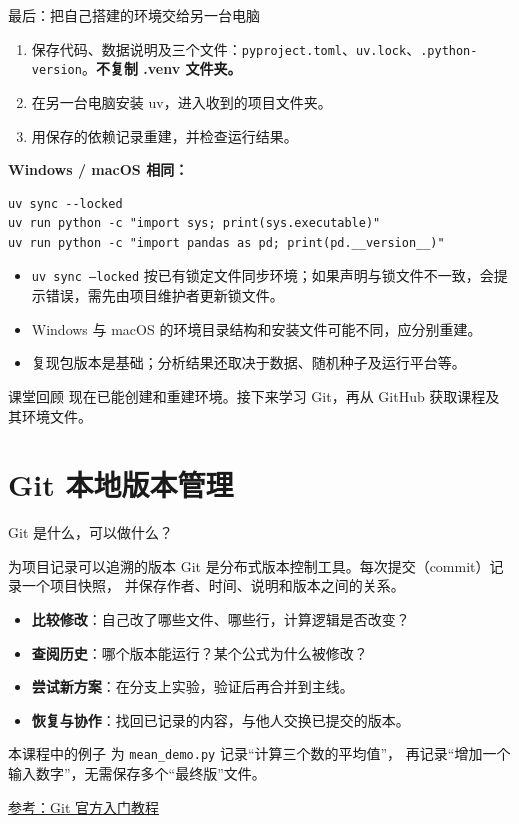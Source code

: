 \documentclass[9pt]{ctexbeamer}
\begin{document}
\begin{frame}[fragile]{最后：把自己搭建的环境交给另一台电脑}
  \begin{enumerate}
    \item 保存代码、数据说明及三个文件：\texttt{pyproject.toml}、\texttt{uv.lock}、\texttt{.python-version}。\textbf{不复制 .venv 文件夹。}
    \item 在另一台电脑安装 uv，进入收到的项目文件夹。
    \item 用保存的依赖记录重建，并检查运行结果。
  \end{enumerate}
  \textbf{Windows / macOS 相同：}
\begin{lstlisting}[language={},numbers=none]
uv sync --locked
uv run python -c "import sys; print(sys.executable)"
uv run python -c "import pandas as pd; print(pd.__version__)"
\end{lstlisting}
  \begin{itemize}
    \item \texttt{uv sync --locked} 按已有锁定文件同步环境；如果声明与锁文件不一致，会提示错误，需先由项目维护者更新锁文件。
    \item Windows 与 macOS 的环境目录结构和安装文件可能不同，应分别重建。
    \item 复现包版本是基础；分析结果还取决于数据、随机种子及运行平台等。
  \end{itemize}
  \begin{block}{课堂回顾}
    现在已能创建和重建环境。接下来学习 Git，再从 GitHub 获取课程及其环境文件。
  \end{block}
\end{frame}

\section{Git 本地版本管理}

\begin{frame}{Git 是什么，可以做什么？}
  \begin{block}{为项目记录可以追溯的版本}
    Git 是分布式版本控制工具。每次提交（commit）记录一个项目快照，
    并保存作者、时间、说明和版本之间的关系。
  \end{block}
  \begin{itemize}
    \item \textbf{比较修改}：自己改了哪些文件、哪些行，计算逻辑是否改变？
    \item \textbf{查阅历史}：哪个版本能运行？某个公式为什么被修改？
    \item \textbf{尝试新方案}：在分支上实验，验证后再合并到主线。
    \item \textbf{恢复与协作}：找回已记录的内容，与他人交换已提交的版本。
  \end{itemize}
  \begin{block}{本课程中的例子}
    为 \texttt{mean\_demo.py} 记录“计算三个数的平均值”，
    再记录“增加一个输入数字”，无需保存多个“最终版”文件。
  \end{block}
  {\tiny\href{https://git-scm.com/docs/gittutorial}{参考：Git 官方入门教程}}
\end{frame}
\end{document}
